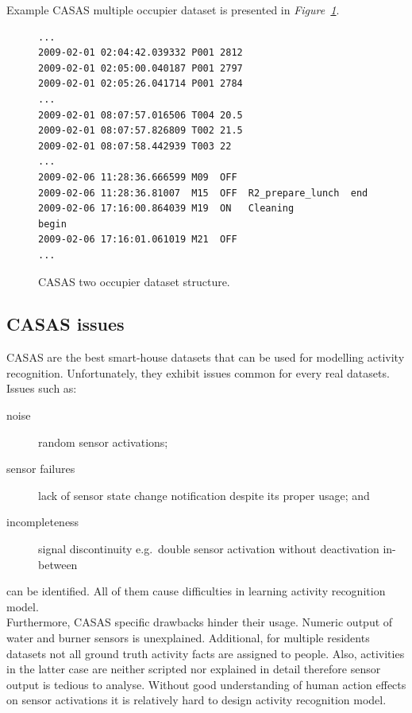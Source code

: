 \documentclass[11pt, a4paper, pdflatex, leqno, twoside, openright]{report}
\begin{document}
Example CASAS multiple occupier dataset is presented in \emph{Figure~\ref{lst:CASAStwoR}}.
\begin{figure}[htb]
  \begin{lstlisting}
...
2009-02-01 02:04:42.039332 P001 2812
2009-02-01 02:05:00.040187 P001 2797
2009-02-01 02:05:26.041714 P001 2784
...
2009-02-01 08:07:57.016506 T004 20.5
2009-02-01 08:07:57.826809 T002 21.5
2009-02-01 08:07:58.442939 T003 22
...
2009-02-06 11:28:36.666599 M09  OFF
2009-02-06 11:28:36.81007  M15  OFF  R2_prepare_lunch  end
2009-02-06 17:16:00.864039 M19  ON   Cleaning          begin
2009-02-06 17:16:01.061019 M21  OFF
...
  \end{lstlisting}
  \caption{CASAS two occupier dataset structure.\label{lst:CASAStwoR}}
\end{figure}

    \subsection{CASAS issues\label{sec:dataIssues}}
CASAS are the best smart-house datasets that can be used for modelling activity recognition. Unfortunately, they exhibit issues common for every real datasets. Issues such as:
\begin{description}
\item[noise] random sensor activations;
\item[sensor failures] lack of sensor state change notification despite its proper usage; and
\item[incompleteness] signal discontinuity e.g.\ double sensor activation without deactivation in-between
\end{description}
can be identified. All of them cause difficulties in learning activity recognition model.\\

Furthermore, CASAS specific drawbacks hinder their usage. Numeric output of water and burner sensors is unexplained. Additional, for multiple residents datasets not all ground truth activity facts are assigned to people. Also, activities in the latter case are neither scripted nor explained in detail therefore sensor output is tedious to analyse. Without good understanding of human action effects on sensor activations it is relatively hard to design activity recognition model.\\
\end{document}
